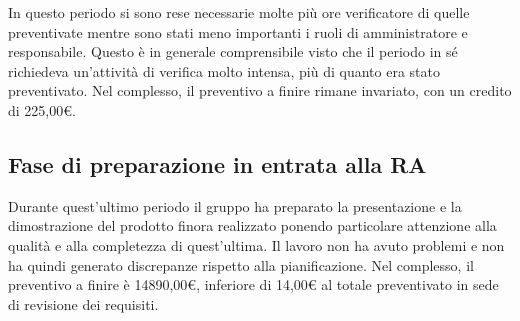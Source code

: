 \documentclass[../piano-di-progetto.tex]{subfiles}
\begin{document}
In questo periodo si sono rese necessarie molte più ore verificatore di quelle preventivate mentre sono stati meno importanti i ruoli di amministratore e responsabile.
Questo è in generale comprensibile visto che il periodo in sé richiedeva un'attività di verifica molto intensa, più di quanto era stato preventivato.
Nel complesso, il preventivo a finire rimane invariato, con un credito di 225,00€.

\subsection{Fase di preparazione in entrata alla RA}%
\label{sub:preventivo_a_finire/preparazione_entrata_ra}

Durante quest'ultimo periodo il gruppo ha preparato la presentazione e la dimostrazione del prodotto finora realizzato ponendo particolare attenzione alla qualità e alla completezza di quest'ultima.
Il lavoro non ha avuto problemi e non ha quindi generato discrepanze rispetto alla pianificazione.
Nel complesso, il preventivo a finire è 14890,00€, inferiore di 14,00€ al totale preventivato in sede di revisione dei requisiti.
\end{document}
